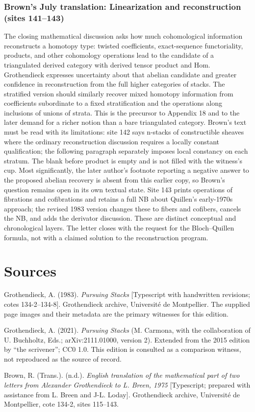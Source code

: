 \documentclass[10pt,oneside]{book}
\begin{document}
\subsection*{Brown's July translation: Linearization and reconstruction (sites 141--143)}
The closing mathematical discussion asks how much cohomological information reconstructs a homotopy type: twisted coefficients, exact-sequence functoriality, products, and other cohomology operations lead to the candidate of a triangulated derived category with derived tensor product and Hom. Grothendieck expresses uncertainty about that abelian candidate and greater confidence in reconstruction from the full higher categories of stacks. The stratified version should similarly recover mixed homotopy information from coefficients subordinate to a fixed stratification and the operations along inclusions of unions of strata. This is the precursor to Appendix 18 and to the later demand for a richer notion than a bare triangulated category. Brown's text must be read with its limitations: site 142 says n-stacks of constructible sheaves where the ordinary reconstruction discussion requires a locally constant qualification; the following paragraph separately imposes local constancy on each stratum. The blank before product is empty and is not filled with the witness's cup. Most significantly, the later author's footnote reporting a negative answer to the proposed abelian recovery is absent from this earlier copy, so Brown's question remains open in its own textual state. Site 143 prints operations of fibrations and cofibrations and retains a full NB about Quillen's early-1970s approach; the revised 1983 version changes these to fibers and cofibers, cancels the NB, and adds the derivator discussion. These are distinct conceptual and chronological layers. The letter closes with the request for the Bloch--Quillen formula, not with a claimed solution to the reconstruction program.


\chapter*{Sources}
Grothendieck, A. (1983). \emph{Pursuing Stacks} [Typescript with handwritten revisions; cotes 134-2--134-8]. Grothendieck archive, Université de Montpellier. The supplied page images and their metadata are the primary witnesses for this edition.

Grothendieck, A. (2021). \emph{Pursuing Stacks} (M. Carmona, with the collaboration of U. Buchholtz, Eds.; arXiv:2111.01000, version 2). Extended from the 2015 edition by ``the scrivener''; CC0 1.0. This edition is consulted as a comparison witness, not reproduced as the source of record.

Brown, R. (Trans.). (n.d.). \emph{English translation of the mathematical part of two letters from Alexander Grothendieck to L. Breen, 1975} [Typescript; prepared with assistance from L. Breen and J-L. Loday]. Grothendieck archive, Université de Montpellier, cote 134-2, sites 115--143.
\end{document}
